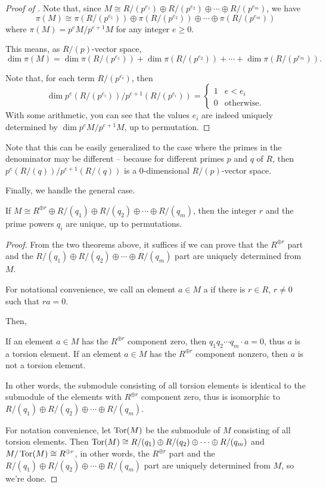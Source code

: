 \begin{proof}[Proof of ]
	Note that, since $M \cong R/(p^{e_1}) \oplus R/(p^{e_2}) \oplus \cdots \oplus R/(p^{e_m})$, we have
	\[ \pi(M) \cong \pi(R/(p^{e_1})) \oplus \pi(R/(p^{e_2})) \oplus \cdots \oplus \pi(R/(p^{e_m})) \]
	where $\pi(M) = p^e M/p^{e+1} M$ for any integer $e \geq 0$.

	This means, as $R/(p)$-vector space,
	\[ \dim \pi(M) = \dim \pi(R/(p^{e_1})) + \dim \pi(R/(p^{e_2})) + \cdots + \dim \pi(R/(p^{e_m})). \]

	Note that, for each term $R/(p^{e_i})$, then
	\[ \dim p^e (R/(p^{e_i})) / p^{e+1} (R/(p^{e_i})) = \begin{cases}
		1 & e < e_i \\
		0 & \text{otherwise}.
	\end{cases} \]
	With some arithmetic, you can see that the values $e_i$ are indeed uniquely determined by $\dim p^e
	M/p^{e+1} M$, up to permutation.
\end{proof}

Note that this can be easily generalized to the case where the primes in the denominator may be different
-- because for different primes $p$ and $q$ of $R$, then $p^e (R/(q))/p^{e+1} (R/(q))$ is a
$0$-dimensional $R/(p)$-vector space.

Finally, we handle the general case.
\begin{theorem}
	If $M \cong R^{\oplus r} \oplus R/(q_1) \oplus R/(q_2) \oplus \cdots \oplus R/(q_m)$,
	then the integer $r$ and the prime powers $q_i$ are unique, up to permutations.
\end{theorem}
\begin{proof}
	From the two theorems above, it suffices if we can prove that the $R^{\oplus r}$ part and the
	$R/(q_1) \oplus R/(q_2) \oplus \cdots \oplus R/(q_m)$ part are uniquely determined from $M$.

	For notational convenience, we call an element $a \in M$ a  if there is $r \in
	R$, $r \neq 0$ such that $r a = 0$.

	Then,
	\begin{itemize}
		\ii If an element $a \in M$ has the $R^{\oplus r}$ component zero, then $q_1 q_2 \cdots q_m \cdot
		a = 0$, thus $a$ is a torsion element.
		\ii If an element $a \in M$ has the $R^{\oplus r}$ component nonzero, then $a$ is not a torsion
		element.
	\end{itemize}

	In other words, the submodule consisting of all torsion elements is identical to the submodule of the
	elements with $R^{\oplus r}$ component zero, thus is isomorphic to
	$R/(q_1) \oplus R/(q_2) \oplus \cdots \oplus R/(q_m)$.

	For notation convenience, let $\operatorname{Tor}(M)$ be the submodule of $M$ consisting of all torsion elements.
	Then $\operatorname{Tor}(M) \cong R/(q_1) \oplus R/(q_2) \oplus \cdots \oplus R/(q_m)$ and $M/\operatorname{Tor}(M) \cong
	R^{\oplus r}$, in other words, the $R^{\oplus r}$ part and the
	$R/(q_1) \oplus R/(q_2) \oplus \cdots \oplus R/(q_m)$ part are uniquely determined from $M$, so we're
	done.
\end{proof}



